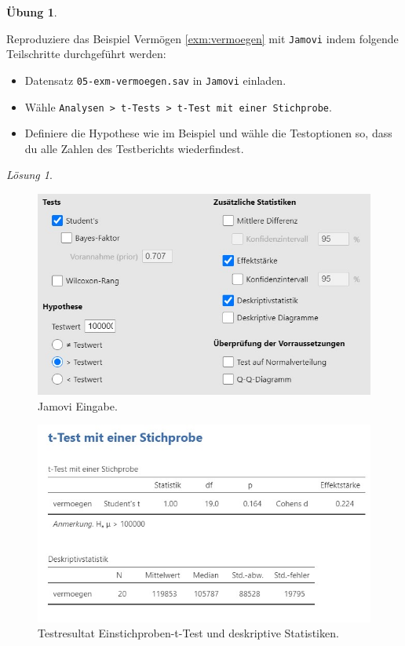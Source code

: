 \documentclass[
]{book}
\providecommand{\tightlist}{%
  \setlength{\itemsep}{0pt}\setlength{\parskip}{0pt}}
\theoremstyle{definition}
\theoremstyle{definition}
\theoremstyle{definition}
\newtheorem{exercise}{Übung}[chapter]
\theoremstyle{definition}
\theoremstyle{remark}
\newtheorem*{solution}{Lösung}
\begin{document}
\begin{exercise}
\protect\hypertarget{exr:vermoegen}{}\label{exr:vermoegen}\leavevmode

Reproduziere das Beispiel Vermögen \ref{exm:vermoegen} mit \texttt{Jamovi} indem folgende Teilschritte durchgeführt werden:

\begin{itemize}
\tightlist
\item
  Datensatz \texttt{05-exm-vermoegen.sav} in \texttt{Jamovi} einladen.
\item
  Wähle \texttt{Analysen\ \textgreater{}\ t-Tests\ \textgreater{}\ t-Test\ mit\ einer\ Stichprobe}.
\item
  Definiere die Hypothese wie im Beispiel und wähle die Testoptionen so, dass du alle Zahlen des Testberichts wiederfindest.
\end{itemize}

\end{exercise}

\begin{solution}
\leavevmode

\begin{figure}
\includegraphics[width=1\linewidth]{figures/05-exr-vermoegen-jmv-input} \caption{Jamovi Eingabe.}\label{fig:sol-vermoegen-input}
\end{figure}

\begin{figure}
\includegraphics[width=1\linewidth]{figures/05-exr-vermoegen-jmv-output} \caption{Testresultat Einstichproben-t-Test und deskriptive Statistiken.}\label{fig:sol-vermoegen-output}
\end{figure}

\end{solution}
\end{document}
